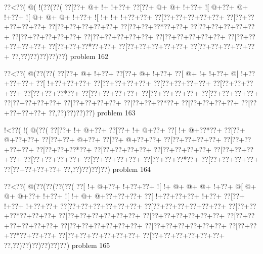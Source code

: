 \vbox{\vbox{\goo
\0??<\0??(\- @(\- !(\0??(\0??(
\0??[\0??+\- @+\- !+\- !+\0??+
\0??[\0??+\- @+\- @+\- !+\0??+
\- ![\- @+\0??+\- @+\- !+\0??+
\- ![\- @+\- @+\- @+\- !+\0??+
\- ![\- !+\- !+\- !+\0??+\0??+
\0??[\0??+\0??+\0??+\0??+\0??+
\0??[\0??+\0??+\0??+\0??+\0??+
\0??[\0??+\0??+\0??+\0??+\0??+
\0??[\0??+\0??+\0??*\0??+\0??+
\0??[\0??+\0??+\0??+\0??+\0??+
\0??[\0??+\0??+\0??+\0??+\0??+
\0??[\0??+\0??+\0??+\0??+\0??+
\0??[\0??+\0??+\0??+\0??+\0??+
\0??[\0??+\0??+\0??+\0??+\0??+
\0??[\0??+\0??+\0??*\0??+\0??+
\0??[\0??+\0??+\0??+\0??+\0??+
\0??[\0??+\0??+\0??+\0??+\0??+
\0??,\0??)\0??)\0??)\0??)\0??)
}
\hfil problem 162\hfil\break
}

\vbox{\vbox{\goo
\0??<\0??(\- @(\0??(\0??(
\0??[\0??+\- @+\- !+\0??+
\0??[\0??+\- @+\- !+\0??+
\0??[\- @+\- !+\- !+\0??+
\- @[\- !+\0??+\0??+\0??+
\0??[\- !+\0??+\0??+\0??+
\0??[\0??+\0??+\0??+\0??+
\0??[\0??+\0??+\0??+\0??+
\0??[\0??+\0??+\0??+\0??+
\0??[\0??+\0??+\0??*\0??+
\0??[\0??+\0??+\0??+\0??+
\0??[\0??+\0??+\0??+\0??+
\0??[\0??+\0??+\0??+\0??+
\0??[\0??+\0??+\0??+\0??+
\0??[\0??+\0??+\0??+\0??+
\0??[\0??+\0??+\0??*\0??+
\0??[\0??+\0??+\0??+\0??+
\0??[\0??+\0??+\0??+\0??+
\0??,\0??)\0??)\0??)\0??)
}
\hfil problem 163\hfil\break
}

\vbox{\vbox{\goo
\- !<\0??(\- !(\- @(\0??(
\0??[\0??+\- !+\- @+\0??+
\0??[\0??+\- !+\- @+\0??+
\0??[\- !+\- @+\0??*\0??+
\0??[\0??+\- @+\0??+\0??+
\0??[\0??+\0??+\- @+\0??+
\0??[\0??+\- @+\0??+\0??+
\0??[\0??+\0??+\0??+\0??+
\0??[\0??+\0??+\0??+\0??+
\0??[\0??+\0??+\0??*\0??+
\0??[\0??+\0??+\0??+\0??+
\0??[\0??+\0??+\0??+\0??+
\0??[\0??+\0??+\0??+\0??+
\0??[\0??+\0??+\0??+\0??+
\0??[\0??+\0??+\0??+\0??+
\0??[\0??+\0??+\0??*\0??+
\0??[\0??+\0??+\0??+\0??+
\0??[\0??+\0??+\0??+\0??+
\0??,\0??)\0??)\0??)\0??)
}
\hfil problem 164\hfil\break
}

\vbox{\vbox{\goo
\0??<\0??(\- @(\0??(\0??(\0??(\0??(
\0??[\- !+\- @+\0??+\- !+\0??+\0??+
\- ![\- !+\- @+\- @+\- @+\- !+\0??+
\- @[\- @+\- @+\- @+\0??+\- !+\0??+
\- ![\- !+\- @+\- @+\0??+\0??+\0??+
\0??[\- !+\0??+\0??+\0??+\- !+\0??+
\0??[\0??+\- !+\0??+\- !+\0??+\0??+
\0??[\0??+\0??+\0??+\0??+\0??+\0??+
\0??[\0??+\0??+\0??+\0??+\0??+\0??+
\0??[\0??+\0??+\0??*\0??+\0??+\0??+
\0??[\0??+\0??+\0??+\0??+\0??+\0??+
\0??[\0??+\0??+\0??+\0??+\0??+\0??+
\0??[\0??+\0??+\0??+\0??+\0??+\0??+
\0??[\0??+\0??+\0??+\0??+\0??+\0??+
\0??[\0??+\0??+\0??+\0??+\0??+\0??+
\0??[\0??+\0??+\0??*\0??+\0??+\0??+
\0??[\0??+\0??+\0??+\0??+\0??+\0??+
\0??[\0??+\0??+\0??+\0??+\0??+\0??+
\0??,\0??)\0??)\0??)\0??)\0??)\0??)
}
\hfil problem 165\hfil\break
}

